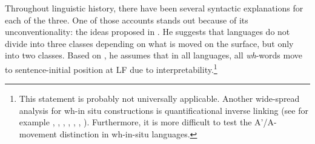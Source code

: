 \documentclass[output=paper,colorlinks,citecolor=brown]{langscibook}
\begin{document}
\noindent Throughout linguistic history, there have been  several syntactic explanations for each of the three. One of those accounts stands out because of its unconventionality: the ideas proposed in \citet{richards1997}. He suggests that languages do not divide into three classes depending on what is moved on the surface, but only into two classes. Based on \citet{huang1982move}, he assumes that in all languages, all \textit{wh}-words move to sentence-initial position at LF due to interpretability.\footnote{This statement is probably not universally applicable. 
Another wide-spread analysis for wh-in situ constructions is quantificational inverse linking (see for example \citealp{may1978grammar}, \citealp{larson1985quantifying}, \citealp{may1985logical}, \citealp{chang1997wh}, \citealp{pollard1998unified}, \citealp{cooper2013quantification}, \citealp{may2017inverse}). Furthermore, it is more difficult to test the A'/A-movement distinction in wh-in-situ languages.
}
\end{document}
